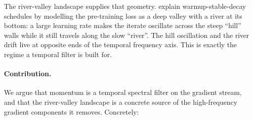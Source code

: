 \documentclass[11pt,a4paper]{article}
\theoremstyle{remark}
\begin{document}
The river-valley landscape supplies that geometry.
\citet{wen2024river} explain warmup-stable-decay schedules by modelling the pre-training loss as a deep valley with a river at its bottom: a large learning rate makes the iterate oscillate across the steep ``hill'' walls while it still travels along the slow ``river''.
The hill oscillation and the river drift live at opposite ends of the temporal frequency axis.
This is exactly the regime a temporal filter is built for.

\paragraph{Contribution.} We argue that momentum is a temporal spectral filter on the gradient stream, and that the river-valley landscape is a concrete source of the high-frequency gradient components it removes.
Concretely:
\end{document}
